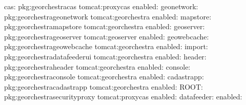 \documentclass[letterpaper,10pt,french]{sphinxmanual}
\begin{document}
\begin{sphinxVerbatim}[commandchars=\\\{\}]
cas:
pkg:georchestra\PYGZhy{}cas
tomcat:proxycas
enabled:
geonetwork:
pkg:georchestra\PYGZhy{}geonetwork
tomcat:georchestra
enabled:
mapstore:
pkg:georchestra\PYGZhy{}mapstore
tomcat:georchestra
enabled:
geoserver:
pkg:georchestra\PYGZhy{}geoserver
tomcat:geoserver
enabled:
geowebcache:
pkg:georchestra\PYGZhy{}geowebcache
tomcat:georchestra
enabled:
import:
pkg:georchestra\PYGZhy{}datafeeder\PYGZhy{}ui
tomcat:georchestra
enabled:
header:
pkg:georchestra\PYGZhy{}header
tomcat:georchestra
enabled:
console:
pkg:georchestra\PYGZhy{}console
tomcat:georchestra
enabled:
cadastrapp:
pkg:georchestra\PYGZhy{}cadastrapp
tomcat:georchestra
enabled:
ROOT:
pkg:georchestra\PYGZhy{}security\PYGZhy{}proxy
tomcat:proxycas
enabled:
datafeeder:
enabled:

\end{sphinxVerbatim}
\end{document}
